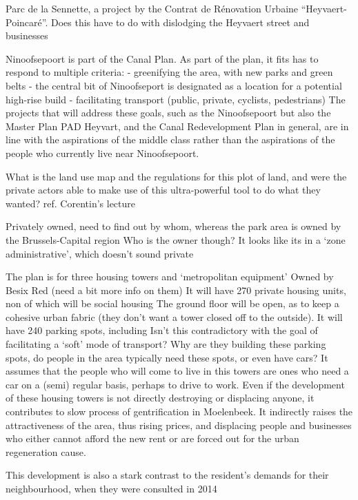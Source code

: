 \documentclass{article}[11pt]
\begin{document}
Parc de la Sennette, a project by the Contrat de Rénovation Urbaine ``Heyvaert-Poincaré''. Does this have to do with dislodging the Heyvaert street and businesses

Ninoofsepoort is part of the Canal Plan. As part of the plan, it fits has to respond to multiple criteria:\cite{diagnosticNinove}
- greenifying the area, with new parks and green belts
- the central bit of Ninoofseport is designated as a location for a potential high-rise build
- facilitating transport (public, private, cyclists, pedestrians)
The projects that will address these goals, such as the Ninoofsepoort but also the Master Plan PAD Heyvart, and the Canal Redevelopment Plan in general, are in line with the aspirations of the middle class rather than the aspirations of the people who currently live near Ninoofsepoort. 

What is the land use map and the regulations for this plot of land, and were the private actors able to make use of this ultra-powerful tool to do what they wanted? ref. Corentin's lecture

Privately owned, need to find out by whom, whereas the park area is owned by the Brussels-Capital region
Who is the owner though? It looks like its in a `zone administrative', which doesn't sound private

The plan is for three housing towers and `metropolitan equipment' 
Owned by Besix Red (need a bit more info on them)
It will have 270 private housing units, non of which will be social housing
The ground floor will be open, as to keep a cohesive urban fabric (they don't want a tower closed off to the outside). 
It will have 240 parking spots, including 
Isn't this contradictory with the goal of facilitating a `soft' mode of transport? Why are they building these parking spots, do people in the area typically need these spots, or even have cars? It assumes that the people who will come to live in this towers are ones who need a car on a (semi) regular basis, perhaps to drive to work.
Even if the development of these housing towers is not directly destroying or displacing anyone, it contributes to slow process of gentrification in Moelenbeek. It indirectly raises the attractiveness of the area, thus rising prices, and displacing people and businesses who either cannot afford the new rent or are forced out for the urban regeneration cause. 

This development is also a stark contrast to the resident's demands for their neighbourhood, when they were consulted in 2014
\end{document}
